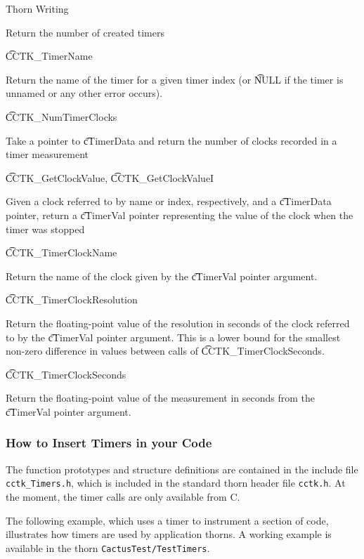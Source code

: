 \begin{cactuspart}{Thorn Writing}
\begin{Lentry}
Return the number of created timers

\item[{\t CCTK\_TimerName}]

Return the name of the timer for a given timer index (or {\t NULL} if 
the timer is unnamed or any other error occurs).

\item[{\t CCTK\_NumTimerClocks}]

Take a pointer to {\t cTimerData} and return the number of clocks 
recorded in a timer measurement

\item[{\t CCTK\_GetClockValue}, {\t CCTK\_GetClockValueI}]

Given a clock referred to by name or index, respectively, and a 
{\t cTimerData} pointer, return a {\t cTimerVal} pointer representing
the value of the clock when the timer was stopped

\item[{\t CCTK\_TimerClockName}]

Return the name of the clock given by the {\t cTimerVal} pointer argument.

\item[{\t CCTK\_TimerClockResolution}]

Return the floating-point value of the resolution in seconds 
of the clock referred to by the {\t cTimerVal} pointer argument.
This is a lower bound for the smallest non-zero difference in values
between calls of {\t CCTK\_TimerClockSeconds}.

\item[{\t CCTK\_TimerClockSeconds}]

Return the floating-point value of the measurement in seconds 
from the {\t cTimerVal} pointer argument.

\end{Lentry}

\subsubsection{How to Insert Timers in your Code}

The function prototypes and structure definitions are contained in the
include file \texttt{cctk\_Timers.h}, which is included in the standard
thorn header file \texttt{cctk.h}. At the moment, the timer calls are only
available from C.

The following example, which uses a timer  to
instrument a section of code, illustrates how timers are used by
application thorns. A working example is available in the thorn
\texttt{CactusTest/TestTimers}.


\end{cactuspart}
